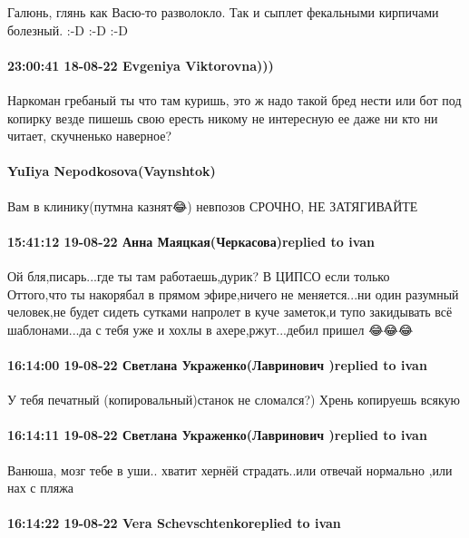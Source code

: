 Галюнь, глянь как Васю-то разволокло. Так и сыплет фекальными кирпичами
болезный. :-D :-D :-D

\paragraph{23:00:41 18-08-22 Evgeniya Viktorovna)))}

Наркоман гребаный ты что там куришь, это ж надо такой бред нести или бот под
копирку везде пишешь свою ересть никому не интересную ее даже ни кто ни читает,
скучненько наверное?

\paragraph{YuIiya Nepodkosova(Vaynshtok)}

Вам в клинику(путмна казнят😂) невпозов СРОЧНО, НЕ ЗАТЯГИВАЙТЕ

\paragraph{15:41:12 19-08-22 Анна Маяцкая(Черкасова)replied to ivan}

Ой бля,писарь...где ты там работаешь,дурик? В ЦИПСО если только 🤣🤣🤣
Оттого,что ты накорябал в прямом эфире,ничего не меняется...ни один разумный
человек,не будет сидеть сутками напролет в куче заметок,и тупо закидывать всё
шаблонами...да с тебя уже и хохлы в ахере,ржут...дебил пришел 😂😂😂

\paragraph{16:14:00 19-08-22 Светлана Украженко(Лавринович )replied to ivan}

У тебя печатный (копировальный)станок не сломался?) Хрень копируешь всякую

\paragraph{16:14:11 19-08-22 Светлана Украженко(Лавринович )replied to ivan}

Ванюша, мозг тебе в уши.. хватит хернёй страдать..или отвечай нормально ,или
нах с пляжа

\paragraph{16:14:22 19-08-22 Vera Schevschtenkoreplied to ivan}

